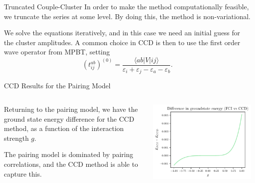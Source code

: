 \documentclass[UKenglish,aspectratio=169]{beamer}
\begin{document}
\begin{frame}{Truncated Couple-Cluster}
    In order to make the method computationally feasible, we truncate the series at some level.
    By doing this, the method is non-variational.

    \bigskip

    We solve the equations iteratively, and in this case we need an initial guess for the cluster amplitudes.
    A common choice in CCD is then to use the first order wave operator from MPBT, setting
    \begin{equation}
        (t_{ij}^{ab})^{(0)} = \frac{
            \langle ab \vert V \vert ij \rangle
        }{
            \varepsilon_i + \varepsilon_j - \varepsilon_a - \varepsilon_b
        }.
    \end{equation}
\end{frame}

\begin{frame}{CCD Results for the Pairing Model}
    \begin{columns}
        \begin{column}{.49\textwidth}
            Returning to the pairing model, we have the ground state energy difference for the CCD method, as a function of the interaction strength $g$.

            \medskip

            The pairing model is dominated by pairing correlations, and the CCD method is able to capture this.
        \end{column}

        \begin{column}{.49\textwidth}
            \includegraphics[width=\textwidth]{../midterm2/figures/ccd_groundstate_energy_diff.pdf}
        \end{column}
    \end{columns}
\end{frame}
\end{document}
